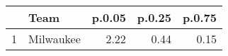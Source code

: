 \begin{table}[ht]
\centering
\begin{tabular}{rlrrr}
  \hline
 & Team & p.0.05 & p.0.25 & p.0.75 \\ 
  \hline
1 & Milwaukee & 2.22 & 0.44 & 0.15 \\ 
   \hline
\end{tabular}
\end{table}
